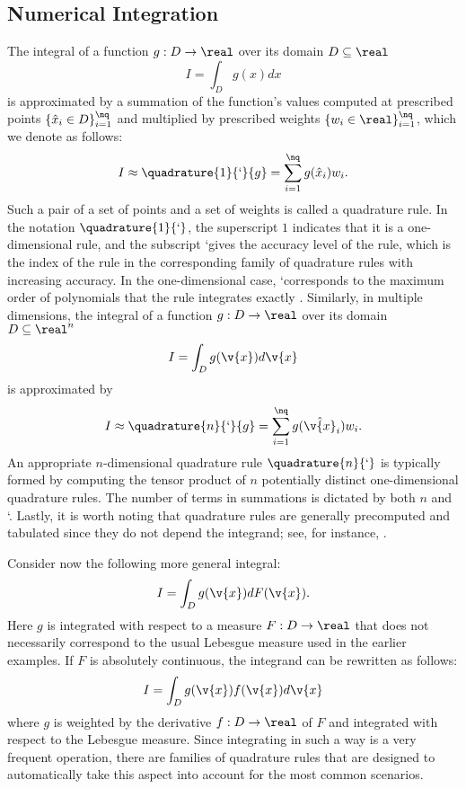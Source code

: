 \subsection{Numerical Integration}

The integral of a function $g: D \to \real$ over its domain $D \subseteq \real$
\[
  I = \int_D g(x) dx
\]
is approximated by a summation of the function's values computed at prescribed
points $\{ \hat{x}_i \in D \}_{i = 1}^\nq$ and multiplied by prescribed weights
$\{ w_i \in \real \}_{i = 1}^\nq$, which we denote as follows:
\[
  I \approx \quadrature{1}{\lq}{g} = \sum_{i = 1}^\nq g(\hat{x}_i) w_i.
\]
Such a pair of a set of points and a set of weights is called a quadrature rule.
In the notation $\quadrature{1}{\lq}$, the superscript $1$ indicates that it is
a one-dimensional rule, and the subscript \lq gives the accuracy level of the
rule, which is the index of the rule in the corresponding family of quadrature
rules with increasing accuracy. In the one-dimensional case, \lq corresponds to
the maximum order of polynomials that the rule integrates exactly
\cite{heiss2008}. Similarly, in multiple dimensions, the integral of a function
$g: D \to \real$ over its domain $D \subseteq \real^n$
\[
  I = \int_D g(\v{x}) d\v{x}
\]
is approximated by
\[
  I \approx \quadrature{n}{\lq}{g} = \sum_{i = 1}^\nq g(\hat{\v{x}}_i) w_i.
\]
An appropriate $n$-dimensional quadrature rule $\quadrature{n}{\lq}$ is
typically formed by computing the tensor product of $n$ potentially distinct
one-dimensional quadrature rules. The number of terms \nq in summations is
dictated by both $n$ and \lq. Lastly, it is worth noting that quadrature rules
are generally precomputed and tabulated since they do not depend the integrand;
see, for instance, \cite{burkardt}.

Consider now the following more general integral:
\[
  I = \int_D g(\v{x}) dF(\v{x}).
\]
Here $g$ is integrated with respect to a measure $F: D \to \real$
\cite{durrett2010} that does not necessarily correspond to the usual Lebesgue
measure used in the earlier examples. If $F$ is absolutely continuous, the
integrand can be rewritten as follows:
\[
  I = \int_D g(\v{x}) f(\v{x}) d\v{x}
\]
where $g$ is weighted by the derivative $f: D \to \real$ of $F$ and integrated
with respect to the Lebesgue measure. Since integrating in such a way is a very
frequent operation, there are families of quadrature rules that are designed to
automatically take this aspect into account for the most common scenarios.

